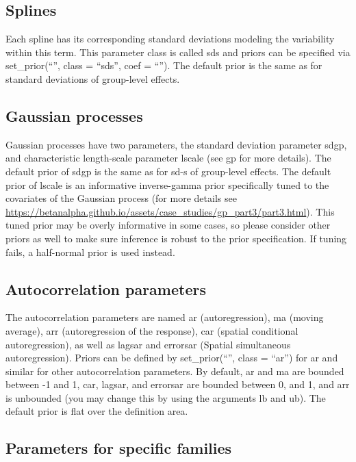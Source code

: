 \documentclass[]{book}
\begin{document}
\hypertarget{splines}{%
\subsection{Splines}\label{splines}}

Each spline has its corresponding standard deviations modeling the variability within this term. This parameter class is called sds and priors can be specified via set\_prior(``'', class = ``sds'', coef = ``''). The default prior is the same as for standard deviations of group-level effects.

\hypertarget{gaussian-processes}{%
\subsection{Gaussian processes}\label{gaussian-processes}}

Gaussian processes have two parameters, the standard deviation parameter sdgp, and characteristic length-scale parameter lscale (see gp for more details). The default prior of sdgp is the same as for sd-s of group-level effects. The default prior of lscale is an informative inverse-gamma prior specifically tuned to the covariates of the Gaussian process (for more details see \url{https://betanalpha.github.io/assets/case_studies/gp_part3/part3.html}). This tuned prior may be overly informative in some cases, so please consider other priors as well to make sure inference is robust to the prior specification. If tuning fails, a half-normal prior is used instead.

\hypertarget{autocorrelation-parameters}{%
\subsection{Autocorrelation parameters}\label{autocorrelation-parameters}}

The autocorrelation parameters are named ar (autoregression), ma (moving average), arr (autoregression of the response), car (spatial conditional autoregression), as well as lagsar and errorsar (Spatial simultaneous autoregression). Priors can be defined by set\_prior(``'', class = ``ar'') for ar and similar for other autocorrelation parameters. By default, ar and ma are bounded between -1 and 1, car, lagsar, and errorsar are bounded between 0, and 1, and arr is unbounded (you may change this by using the arguments lb and ub). The default prior is flat over the definition area.

\hypertarget{parameters-for-specific-families}{%
\subsection{Parameters for specific families}\label{parameters-for-specific-families}}
\end{document}
